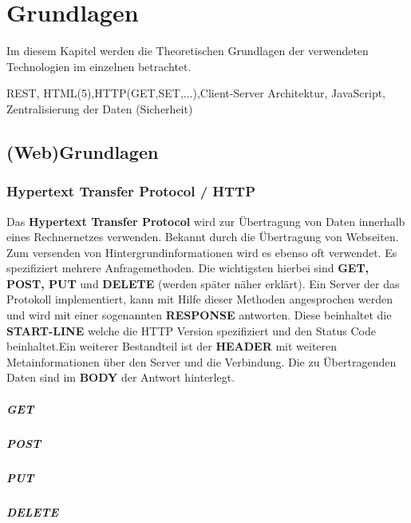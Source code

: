 \chapter{Grundlagen} \label{Theoretische Grundlagen}
Im diesem Kapitel werden die Theoretischen Grundlagen der verwendeten Technologien im einzelnen betrachtet.


REST, HTML(5),HTTP(GET,SET,...),Client-Server Architektur, JavaScript, Zentralisierung der Daten (Sicherheit)


\section{(Web)Grundlagen}
\subsection{Hypertext Transfer Protocol / HTTP}
Das \textbf{Hypertext Transfer Protocol} wird zur Übertragung von Daten innerhalb eines Rechnernetzes verwenden. Bekannt durch die Übertragung von Webseiten. Zum versenden von Hintergrundinformationen wird es ebenso oft verwendet. Es spezifiziert mehrere Anfragemethoden. Die wichtigsten hierbei sind \textbf{GET, POST, PUT} und \textbf{DELETE} (werden später näher erklärt). Ein Server der das Protokoll implementiert, kann mit Hilfe dieser Methoden angesprochen werden und wird mit einer sogenannten \textbf{RESPONSE} antworten.
Diese beinhaltet die \textbf{START-LINE} welche die HTTP Version spezifiziert und den Status Code beinhaltet.Ein weiterer Bestandteil ist der \textbf{HEADER} mit weiteren Metainformationen über den Server und die Verbindung. Die zu Übertragenden Daten sind im \textbf{BODY} der Antwort hinterlegt.

\paragraph{GET}

\paragraph{POST}

\paragraph{PUT}

\paragraph{DELETE}


